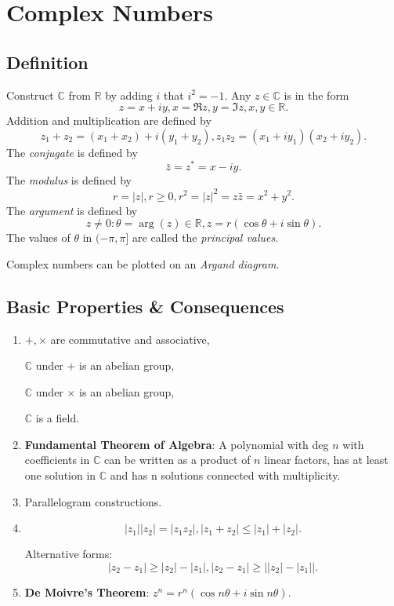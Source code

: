 \documentclass[a4paper]{article}
\begin{document}
\maketitle
\tableofcontents
\section{Complex Numbers}
\subsection{Definition}
\begin{definition}
  Construct $\mathbb{C} $ from $ \mathbb{R}  $ by adding $i$ that
  $i^2 = -1$. Any $z\in \mathbb{C}$ is in the form
  \[
    z = x+iy, x = \Re z, y= \Im z, x,y\in \mathbb{R} .
  \]
  Addition and multiplication are defined by
  \[
    z_1+z_2 = (x_1+x_2) + i(y_1+y_2), z_1z_2 = (x_1+iy_1)(x_2+iy_2)
  .\]
  The \textit{conjugate} is defined by
  \[
    \bar{z} = z^* = x-iy
  .\]
  The \textit{modulus} is defined by
  \[
    r = |z|, r\ge 0, r^2=|z|^2=z\bar{z}=x^2+y^2
  .\]
  The \textit{argument} is defined by
  \[
    z\neq 0: \theta=\arg(z)\in \mathbb{R}, z=r(\cos \theta+i\sin \theta)
  .\]
  The values of $ \theta $ in $ (-\pi, \pi] $ are called the
  \textit{principal values}.

  Complex numbers can be plotted on an \textit{Argand diagram}.
\end{definition}
\subsection{Basic Properties \& Consequences}
\begin{enumerate}[(1)]
  \item $ +, \times $ are commutative and associative,

    $ \mathbb{C} $ under $+$ is an abelian group,

    $ \mathbb{C} $ under $\times$ is an abelian group,

    $ \mathbb{C} $ is a field.
  \item \textbf{Fundamental Theorem of Algebra}: A polynomial with
    deg $n$ with coefficients in $ \mathbb{C}  $ can be written as a
    product of $n$ linear factors, has at least one solution in $
    \mathbb{C}  $ and has n solutions connected with multiplicity.
  \item Parallelogram constructions.
  \item \[
      \left| z_1 \right| \left| z_2 \right| = \left| z_1z_2 \right|,
      \left| z_1+z_2 \right| \le \left| z_1 \right| +\left| z_2 \right|
    .\]

    Alternative forms:
    \[
      \left| z_2-z_1 \right| \ge \left| z_2 \right| -\left| z_1
      \right|, \left| z_2-z_1 \right| \ge \left| |z_2|-|z_1| \right|
    .\]
  \item \textbf{De Moivre's Theorem}: $ z^n = r^n(\cos n\theta+i\sin n\theta) $.
\end{enumerate}
\end{document}
